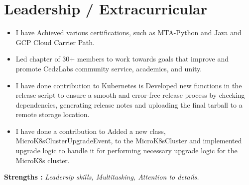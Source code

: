 \documentclass[letterpaper,11pt]{article}
\newcommand{\resumeItem}[1]{
  \item\small{
    {#1 \vspace{-2pt}}
  }
}
\newcommand{\resumeItemListStart}{\begin{itemize}}
\newcommand{\resumeItemListEnd}{\end{itemize}\vspace{-5pt}}
\begin{document}
\section{Leadership / Extracurricular}
            \resumeItemListStart
                \resumeItem{I have Achieved
                various certifications, such as MTA-Python and Java and GCP Cloud Carrier Path.}
                \vspace{-7pt}
                \resumeItem{Led chapter of 30+ members to work towards goals that improve and promote CedzLabs community service, academics, and unity.}
                \vspace{-7pt}
                \resumeItem{I have done contribution to Kubernetes is Developed new functions in the release script to ensure a smooth and error-free release process by checking dependencies, generating release notes and uploading the final tarball to a remote storage location.}
                \vspace{-7pt}
                \resumeItem{I have done a contribution to Added a new class, MicroK8sClusterUpgradeEvent, to the MicroK8sCluster and implemented upgrade logic to handle it for performing necessary upgrade logic for the MicroK8s cluster.}
            \resumeItemListEnd
    \vspace{-8pt}
    \textbf{Strengths : }\emph{Leadersip skills,
Multitasking,
Attention to details.
}
\end{document}
